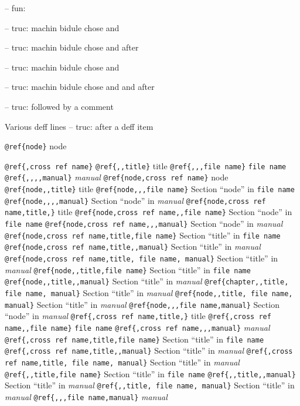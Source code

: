 \documentclass{book}
\begin{document}
\begin{titlepage}
\hbox{}-- fun: 


\hbox{}-- truc: machin bidule chose and


%
\hbox{}-- truc: machin bidule chose and  after


%
\hbox{}-- truc: machin bidule chose and 


%
\hbox{}-- truc: machin bidule chose and and after


%
\hbox{}-- truc: followed by a comment


%
Various deff lines
\hbox{}-- truc: after a deff item


%

\texttt{@ref\{node\}} node

\texttt{@ref\{,cross ref name\}} 
\texttt{@ref\{,,title\}} title
\texttt{@ref\{,,,file name\}} \texttt{file name}
\texttt{@ref\{,,,,manual\}} \textit{manual}
\texttt{@ref\{node,cross ref name\}} node
\texttt{@ref\{node,,title\}} title
\texttt{@ref\{node,,,file name\}} Section ``node'' in \texttt{file name}
\texttt{@ref\{node,,,,manual\}} Section ``node'' in \textit{manual}
\texttt{@ref\{node,cross ref name,title,\}} title
\texttt{@ref\{node,cross ref name,,file name\}} Section ``node'' in \texttt{file name}
\texttt{@ref\{node,cross ref name,,,manual\}} Section ``node'' in \textit{manual}
\texttt{@ref\{node,cross ref name,title,file name\}} Section ``title'' in \texttt{file name}
\texttt{@ref\{node,cross ref name,title,,manual\}} Section ``title'' in \textit{manual}
\texttt{@ref\{node,cross ref name,title, file name, manual\}} Section ``title'' in \textit{manual}
\texttt{@ref\{node,,title,file name\}} Section ``title'' in \texttt{file name}
\texttt{@ref\{node,,title,,manual\}} Section ``title'' in \textit{manual}
\texttt{@ref\{chapter,,title, file name, manual\}} Section ``title'' in \textit{manual}
\texttt{@ref\{node,,title, file name, manual\}} Section ``title'' in \textit{manual}
\texttt{@ref\{node,,,file name,manual\}} Section ``node'' in \textit{manual}
\texttt{@ref\{,cross ref name,title,\}} title
\texttt{@ref\{,cross ref name,,file name\}} \texttt{file name}
\texttt{@ref\{,cross ref name,,,manual\}} \textit{manual}
\texttt{@ref\{,cross ref name,title,file name\}} Section ``title'' in \texttt{file name}
\texttt{@ref\{,cross ref name,title,,manual\}} Section ``title'' in \textit{manual}
\texttt{@ref\{,cross ref name,title, file name, manual\}} Section ``title'' in \textit{manual}
\texttt{@ref\{,,title,file name\}} Section ``title'' in \texttt{file name}
\texttt{@ref\{,,title,,manual\}} Section ``title'' in \textit{manual}
\texttt{@ref\{,,title, file name, manual\}} Section ``title'' in \textit{manual}
\texttt{@ref\{,,,file name,manual\}} \textit{manual}


\end{titlepage}
\end{document}
